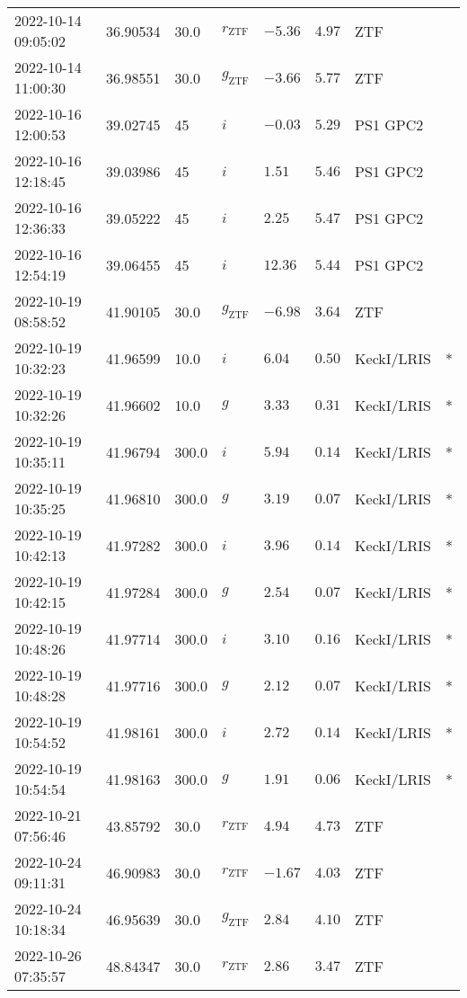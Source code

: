 \documentclass{nature_plusfigure}
\begin{document}
\begin{supplement}
\begin{center}
\begin{longtable}{llllllll}
2022-10-14 09:05:02 & 36.90534 & 30.0 & ${r}_\mathrm{ZTF}$ & $-5.36$ & $4.97$ & ZTF &  \\ 
2022-10-14 11:00:30 & 36.98551 & 30.0 & ${g}_\mathrm{ZTF}$ & $-3.66$ & $5.77$ & ZTF &  \\ 
2022-10-16 12:00:53 & 39.02745 & 45 & $i$ & $-0.03$ & $5.29$ & PS1 GPC2 &  \\ 
2022-10-16 12:18:45 & 39.03986 & 45 & $i$ & $1.51$ & $5.46$ & PS1 GPC2 &  \\ 
2022-10-16 12:36:33 & 39.05222 & 45 & $i$ & $2.25$ & $5.47$ & PS1 GPC2 &  \\ 
2022-10-16 12:54:19 & 39.06455 & 45 & $i$ & $12.36$ & $5.44$ & PS1 GPC2 &  \\ 
2022-10-19 08:58:52 & 41.90105 & 30.0 & ${g}_\mathrm{ZTF}$ & $-6.98$ & $3.64$ & ZTF &  \\ 
2022-10-19 10:32:23 & 41.96599 & 10.0 & $i$ & $6.04$ & $0.50$ & KeckI/LRIS & * \\ 
2022-10-19 10:32:26 & 41.96602 & 10.0 & $g$ & $3.33$ & $0.31$ & KeckI/LRIS & * \\ 
2022-10-19 10:35:11 & 41.96794 & 300.0 & $i$ & $5.94$ & $0.14$ & KeckI/LRIS & * \\ 
2022-10-19 10:35:25 & 41.96810 & 300.0 & $g$ & $3.19$ & $0.07$ & KeckI/LRIS & * \\ 
2022-10-19 10:42:13 & 41.97282 & 300.0 & $i$ & $3.96$ & $0.14$ & KeckI/LRIS & * \\ 
2022-10-19 10:42:15 & 41.97284 & 300.0 & $g$ & $2.54$ & $0.07$ & KeckI/LRIS & * \\ 
2022-10-19 10:48:26 & 41.97714 & 300.0 & $i$ & $3.10$ & $0.16$ & KeckI/LRIS & * \\ 
2022-10-19 10:48:28 & 41.97716 & 300.0 & $g$ & $2.12$ & $0.07$ & KeckI/LRIS & * \\ 
2022-10-19 10:54:52 & 41.98161 & 300.0 & $i$ & $2.72$ & $0.14$ & KeckI/LRIS & * \\ 
2022-10-19 10:54:54 & 41.98163 & 300.0 & $g$ & $1.91$ & $0.06$ & KeckI/LRIS & * \\ 
2022-10-21 07:56:46 & 43.85792 & 30.0 & ${r}_\mathrm{ZTF}$ & $4.94$ & $4.73$ & ZTF &  \\ 
2022-10-24 09:11:31 & 46.90983 & 30.0 & ${r}_\mathrm{ZTF}$ & $-1.67$ & $4.03$ & ZTF &  \\ 
2022-10-24 10:18:34 & 46.95639 & 30.0 & ${g}_\mathrm{ZTF}$ & $2.84$ & $4.10$ & ZTF &  \\ 
2022-10-26 07:35:57 & 48.84347 & 30.0 & ${r}_\mathrm{ZTF}$ & $2.86$ & $3.47$ & ZTF &  \\ 

\end{longtable}
\end{center}
\end{supplement}
\end{document}
